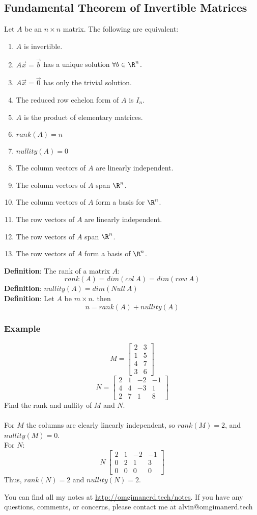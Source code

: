 \documentclass[letterpaper, 12pt]{math}
\begin{document}
\subsection*{Fundamental Theorem of Invertible Matrices}
Let \( A \) be an \( n\times n \) matrix. The following are equivalent:
\begin{enumerate}
  \item \( A \) is invertible.
  \item \( A\vec{x} = \vec{b} \) has a unique solution \( \forall{b}\in\R^n \).
  \item \( A\vec{x} = \vec{0} \) has only the trivial solution.
  \item The reduced row echelon form of \( A \) is \( I_n \).
  \item \( A \) is the product of elementary matrices.
  \item \( rank(A) = n \)
  \item \( nullity(A) = 0 \)
  \item The column vectors of \( A \) are linearly independent.
  \item The column vectors of \( A \) span \( \R^n \).
  \item The column vectors of \( A \) form a basis for \( \R^n \).
  \item The row vectors of \( A \) are linearly independent.
  \item The row vectors of \( A \) span \( \R^n \).
  \item The row vectors of \( A \) form a basis of \( \R^n \).
\end{enumerate}
\textbf{Definition}: The rank of a matrix \( A \):
\[ rank(A) = dim(col~A) = dim(row~A) \]
\textbf{Definition}: \( nullity(A) = dim(Null~A) \) \\
\textbf{Definition}: Let \( A \) be \( m\times n \). then
\[ n = rank(A)+nullity(A) \]

\subsubsection*{Example}
\[ M = \begin{bmatrix}2 & 3 \\ 1 & 5 \\ 4 & 7 \\ 3 & 6\end{bmatrix} \]
\[ N = \begin{bmatrix}2 & 1 & -2 & -1 \\ 4 & 4 & -3 & 1 \\ 2 & 7 & 1 &
  8\end{bmatrix} \]
Find the rank and nullity of \( M \) and \( N \). \\ \\
For \( M \) the columns are clearly linearly independent, so \( rank(M) = 2 \),
and \( nullity(M) = 0 \). \\
For \( N \):
\[ N~\begin{bmatrix}2 & 1 & -2 & -1 \\ 0 & 2 & 1 & 3 \\ 0 & 0 & 0 &
  0\end{bmatrix} \]
Thus, \( rank(N) = 2 \) and \( nullity(N) = 2 \).

\begin{center}
  You can find all my notes at \url{http://omgimanerd.tech/notes}. If you have
  any questions, comments, or concerns, please contact me at
  alvin@omgimanerd.tech
\end{center}
\end{document}
